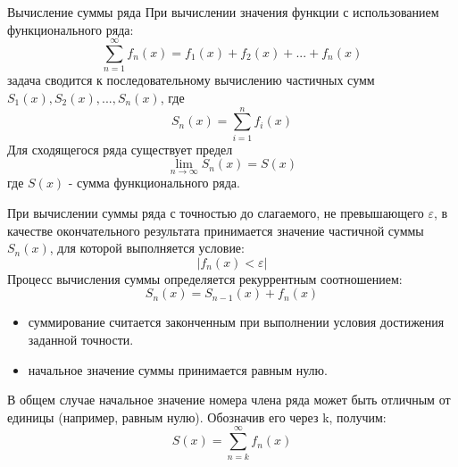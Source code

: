\documentclass{beamer}
\begin{document}
\begin{frame}{Вычисление суммы ряда}
При вычислении значения функции с использованием функционального ряда:
\[\sum\limits_{n=1}^\infty f_n(x)=f_1(x)+f_2(x)+...+f_n(x)\]
задача сводится к последовательному вычислению частичных сумм $S_1(x), S_2(x),..., S_n(x)$, где 
\[S_n(x)=\sum\limits_{i=1}^n f_i(x)\]
Для сходящегося ряда существует предел 
\[\lim\limits_{n\to \infty} S_n(x)=S(x)\]
где $S(x)$ - сумма функционального ряда.
\end{frame}

\begin{frame}
При вычислении суммы ряда с точностью до слагаемого, не превышающего $\varepsilon$, в качестве окончательного результата принимается значение частичной суммы $S_n(x)$, для которой выполняется условие:
\[|f_n(x)<\varepsilon|\]
Процесс вычисления суммы определяется рекуррентным соотношением:
\[S_n(x)=S_{n-1}(x)+f_n(x)\]
\begin{itemize}
\item суммирование считается законченным при выполнении условия достижения заданной точности. 
\item начальное значение суммы принимается равным нулю.
\end{itemize}
В общем случае начальное значение номера члена ряда может быть отличным от единицы (например, равным нулю). Обозначив его через k, получим:
\[S(x)=\sum\limits_{n=k}^\infty f_n(x)\]
\end{frame}

\end{document}
